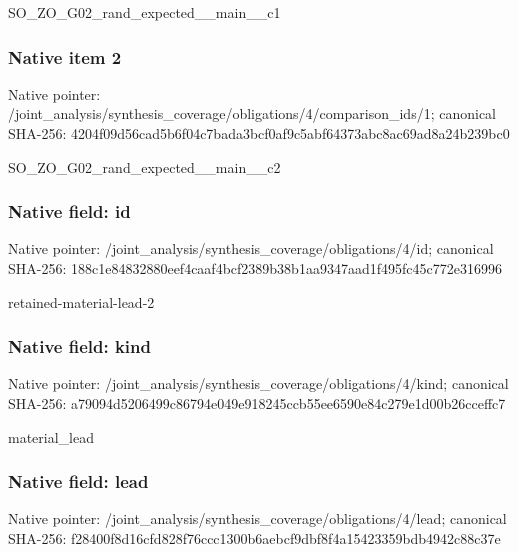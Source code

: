 \documentclass[10pt,a4paper]{article}
\begin{document}
\begingroup\raggedright\sloppy SO\_\allowbreak{}ZO\_\allowbreak{}G02\_\allowbreak{}rand\_\allowbreak{}expected\_\allowbreak{}\_\allowbreak{}main\_\allowbreak{}\_\allowbreak{}c1\par\endgroup

\subsubsection{Native item 2}
Native pointer: /joint\_\allowbreak{}analysis/synthesis\_\allowbreak{}coverage/obligations/4/comparison\_\allowbreak{}ids/1; canonical SHA-256: 4204f09d56cad5b6f04c7bada3bcf0af9c5abf64373abc8ac69ad8a24b239bc0

\begingroup\raggedright\sloppy SO\_\allowbreak{}ZO\_\allowbreak{}G02\_\allowbreak{}rand\_\allowbreak{}expected\_\allowbreak{}\_\allowbreak{}main\_\allowbreak{}\_\allowbreak{}c2\par\endgroup

\subsubsection{Native field: id}
Native pointer: /joint\_\allowbreak{}analysis/synthesis\_\allowbreak{}coverage/obligations/4/id; canonical SHA-256: 188c1e84832880eef4caaf4bcf2389b38b1aa9347aad1f495fc45c772e316996

\begingroup\raggedright\sloppy retained-material-lead-2\par\endgroup

\subsubsection{Native field: kind}
Native pointer: /joint\_\allowbreak{}analysis/synthesis\_\allowbreak{}coverage/obligations/4/kind; canonical SHA-256: a79094d5206499c86794e049e918245ccb55ee6590e84c279e1d00b26cceffc7

\begingroup\raggedright\sloppy material\_\allowbreak{}lead\par\endgroup

\subsubsection{Native field: lead}
Native pointer: /joint\_\allowbreak{}analysis/synthesis\_\allowbreak{}coverage/obligations/4/lead; canonical SHA-256: f28400f8d16cfd828f76ccc1300b6aebcf9dbf8f4a15423359bdb4942c88c37e
\end{document}
